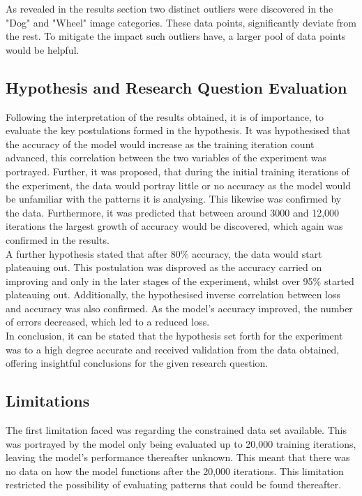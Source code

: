As revealed in the results section two distinct outliers were discovered in the "Dog" and "Wheel" image categories. These data points, significantly deviate from the rest. To mitigate the impact such outliers have, a larger pool of data points would be helpful.  \\


\subsection{Hypothesis and Research Question Evaluation}
Following the interpretation of the results obtained, it is of importance, to evaluate the key postulations formed in the hypothesis. It was hypothesised that the accuracy of the model would increase as the training iteration count advanced, this correlation between the two variables of the experiment was portrayed. Further, it was proposed, that during the initial training iterations of the experiment, the data would portray little or no accuracy as the model would be unfamiliar with the patterns it is analysing. This likewise was confirmed by the data. Furthermore, it was predicted that between around 3000 and 12,000 iterations the largest growth of accuracy would be discovered, which again was confirmed in the results. \\

A further hypothesis stated that after 80\% accuracy, the data would start plateauing out. This postulation was disproved as the accuracy carried on improving and only in the later stages of the experiment, whilst over 95\% started plateauing out.  Additionally, the hypothesised inverse correlation between loss and accuracy was also confirmed. As the model's accuracy improved, the number of errors decreased, which led to a reduced loss.\\ 

In conclusion, it can be stated that the hypothesis set forth for the experiment was to a high degree accurate and received validation from the data obtained, offering insightful conclusions for the given research question.
\\	

\subsection{Limitations}
The first limitation faced was regarding the constrained data set available. This was portrayed by the model only being evaluated up to 20,000 training iterations, leaving the model's performance thereafter unknown. This meant that there was no data on how the model functions after the 20,000 iterations. This limitation restricted the possibility of evaluating patterns that could be found thereafter. \\

